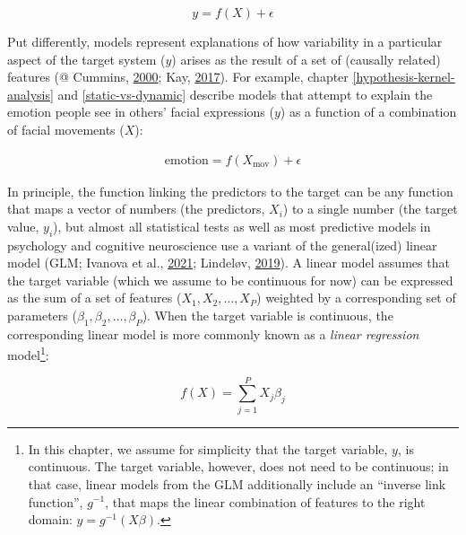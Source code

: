 \documentclass[11pt,american,]{memoir} %
\let\rmarkdownfootnote\footnote%
\def\footnote{\protect\rmarkdownfootnote}
\begin{document}
\begin{equation}
y = f(X) + \epsilon
\end{equation}

Put differently, models represent explanations of how variability in a particular aspect of the target system (\(y\)) arises as the result of a set of (causally related) features (@ Cummins, \protect\hyperlink{ref-Cummins2000-pk}{2000}; Kay, \protect\hyperlink{ref-Kay2017-vr}{2017}). For example, chapter \ref{hypothesis-kernel-analysis} and \ref{static-vs-dynamic} describe models that attempt to explain the emotion people see in others' facial expressions (\(y\)) as a function of a combination of facial movements (\(X\)):

\begin{align}
\mathrm{emotion} = f(X_{\mathrm{mov}}) + \epsilon
\end{align}

In principle, the function linking the predictors to the target can be any function that maps a vector of numbers (the predictors, \(X_{i}\)) to a single number (the target value, \(y_{i}\)), but almost all statistical tests as well as most predictive models in psychology and cognitive neuroscience use a variant of the general(ized) linear model (GLM; Ivanova et al., \protect\hyperlink{ref-Ivanova2021-wk}{2021}; Lindeløv, \protect\hyperlink{ref-Lindelov2019-jk}{2019}). A linear model assumes that the target variable (which we assume to be continuous for now) can be expressed as the sum of a set of features (\(X_{1}, X_{2}, \dots , X_{P}\)) weighted by a corresponding set of parameters (\(\beta_{1}, \beta_{2}, \dots , \beta_{P}\)). When the target variable is continuous, the corresponding linear model is more commonly known as a \emph{linear regression} model\footnote{In this chapter, we assume for simplicity that the target variable, \(y\), is continuous. The target variable, however, does not need to be continuous; in that case, linear models from the GLM additionally include an ``inverse link function'', \(g^{-1}\), that maps the linear combination of features to the right domain: \(y = g^{-1}(X\beta)\).}:

\begin{equation}
f(X) = \sum_{j=1}^{P}X_{j} \beta_{j}
\end{equation}
\end{document}
